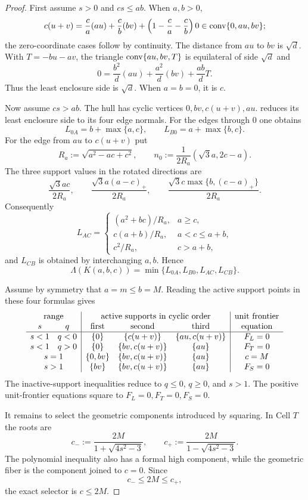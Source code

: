 \begin{proof}
First assume $s>0$ and $cs\le ab$.  When $a,b>0$,
\[
 c(u+v)=\frac ca(au)+\frac cb(bv)
       +\left(1-\frac ca-\frac cb\right)0
 \in\mathrm{conv}\{0,au,bv\};
\]
the zero-coordinate cases follow by continuity.  The distance from $au$ to
$bv$ is $\sqrt d$.  With $T=-bu-av$, the triangle
$\mathrm{conv}\{au,bv,T\}$ is equilateral of side $\sqrt d$ and
\[
 0=\frac{b^2}{d}(au)+\frac{a^2}{d}(bv)+\frac{ab}{d}T.
\]
Thus the least enclosure side is $\sqrt d$.  When $a=b=0$, it is $c$.

Now assume $cs>ab$.  The hull has cyclic vertices $0,bv,c(u+v),au$.
 reduces its least enclosure side
to its four edge normals.  For the edges through $0$ one obtains
\[
 L_{0A}=b+\max\{a,c\},
 \qquad L_{B0}=a+\max\{b,c\}.
\]
For the edge from $au$ to $c(u+v)$ put
\[
 R_a:=\sqrt{a^2-ac+c^2},
 \qquad n_0:=\frac1{2R_a}(\sqrt3a,2c-a).
\]
The three support values in the rotated directions are
\[
 \frac{\sqrt3ac}{2R_a},\qquad
 \frac{\sqrt3a(a-c)_+}{2R_a},\qquad
 \frac{\sqrt3c\max\{b,(c-a)_+\}}{2R_a}.
\]
Consequently
\[
 L_{AC}=
 \begin{cases}
 (a^2+bc)/R_a,&a\ge c,\\
 c(a+b)/R_a,&a<c\le a+b,\\
 c^2/R_a,&c>a+b,
 \end{cases}
\]
and $L_{CB}$ is obtained by interchanging $a,b$.  Hence
\[
 \Lambda(K(a,b,c))
 =\min\{L_{0A},L_{B0},L_{AC},L_{CB}\}.
\]

Assume by symmetry that $a=m\le b=M$.  Reading the active support points in
these four formulas gives
\[
\begin{array}{cc|ccc|c}
\multicolumn{2}{c|}{\text{range}}
 &\multicolumn{3}{c|}{\text{active supports in cyclic order}}
 &\text{unit frontier}\\
s&q&\text{first}&\text{second}&\text{third}&\text{equation}\\
\hline
s<1&q<0&\{0\}&\{c(u+v)\}&\{au,c(u+v)\}&F_L=0\\
s<1&q>0&\{0\}&\{bv,c(u+v)\}&\{au\}&F_T=0\\
\multicolumn{2}{c|}{s=1}&\{0,bv\}&\{bv,c(u+v)\}&\{au\}&c=M\\
\multicolumn{2}{c|}{s>1}&\{bv\}&\{bv,c(u+v)\}&\{au\}&F_S=0
\end{array}
\]
The inactive-support inequalities reduce to $q\le0$, $q\ge0$, and $s>1$.
The positive unit-frontier equations square to $F_L=0,F_T=0,F_S=0$.

It remains to select the geometric components introduced by squaring.  In
Cell $T$ the roots are
\[
 c_-:=\frac{2M}{1+\sqrt{4s^2-3}},
 \qquad
 c_+:=\frac{2M}{1-\sqrt{4s^2-3}}.
\]
The polynomial inequality also has a formal high component, while the
geometric fiber is the component joined to $c=0$.  Since
\[
 c_-\le2M\le c_+,
\]
the exact selector is $c\le2M$.


\end{proof}
